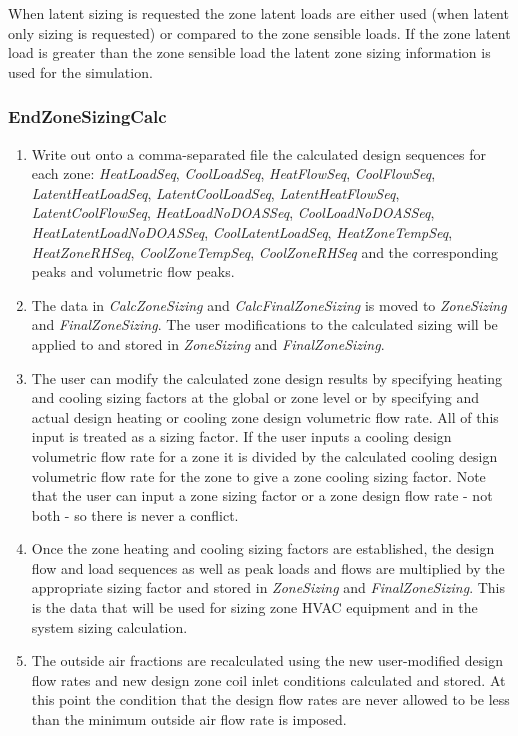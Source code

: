 When latent sizing is requested the zone latent loads are either used (when latent only sizing is requested) or compared to the zone sensible loads. If the zone latent load is greater than the zone sensible load the latent zone sizing information is used for the simulation.
\subsubsection{EndZoneSizingCalc}\label{endzonesizingcalc}

\begin{enumerate}
\def\labelenumi{(\arabic{enumi})}
\item
  Write out onto a comma-separated file the calculated design sequences for each zone: \emph{HeatLoadSeq}, \emph{CoolLoadSeq}, \emph{HeatFlowSeq}, \emph{CoolFlowSeq}, \emph{LatentHeatLoadSeq}, \emph{LatentCoolLoadSeq}, \emph{LatentHeatFlowSeq}, \emph{LatentCoolFlowSeq}, \emph{HeatLoadNoDOASSeq}, \emph{CoolLoadNoDOASSeq}, \emph{HeatLatentLoadNoDOASSeq}, \emph{CoolLatentLoadSeq}, \emph{HeatZoneTempSeq}, \emph{HeatZoneRHSeq}, \emph{CoolZoneTempSeq}, \emph{CoolZoneRHSeq} and the corresponding peaks and volumetric flow peaks.
\item
  The data in \emph{CalcZoneSizing} and \emph{CalcFinalZoneSizing} is moved to \emph{ZoneSizing} and \emph{FinalZoneSizing}. The user modifications to the calculated sizing will be applied to and stored in \emph{ZoneSizing} and \emph{FinalZoneSizing}.
\item
  The user can modify the calculated zone design results by specifying heating and cooling sizing factors at the global or zone level or by specifying and actual design heating or cooling zone design volumetric flow rate. All of this input is treated as a sizing factor. If the user inputs a cooling design volumetric flow rate for a zone it is divided by the calculated cooling design volumetric flow rate for the zone to give a zone cooling sizing factor. Note that the user can input a zone sizing factor or a zone design flow rate - not both - so there is never a conflict.
\item
  Once the zone heating and cooling sizing factors are established, the design flow and load sequences as well as peak loads and flows are multiplied by the appropriate sizing factor and stored in \emph{ZoneSizing} and \emph{FinalZoneSizing}. This is the data that will be used for sizing zone HVAC equipment and in the system sizing calculation.
\item
  The outside air fractions are recalculated using the new user-modified design flow rates and new design zone coil inlet conditions calculated and stored. At this point the condition that the design flow rates are never allowed to be less than the minimum outside air flow rate is imposed.
\end{enumerate}


